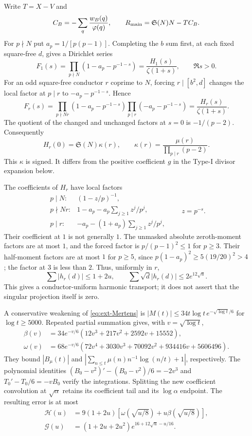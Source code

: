 \documentclass[11pt,a4paper]{article}
\theoremstyle{definition}
\theoremstyle{remark}
\begin{document}
Write $T=X-V$ and
\[
 C_B=-\sum_q\frac{w_B(q)}{\varphi(q)},\qquad
 R_{\rm main}=\mathfrak S(N)N-TC_B.
\]
For $p\nmid N$ put $a_p=1/[p(p-1)]$. Completing the $b$ sum first,
at each fixed square-free $d$, gives a Dirichlet series
\[
 F_1(s)=\prod_{p\nmid N}(1-a_p-p^{-1-s})
           =\frac{H_1(s)}{\zeta(1+s)},\qquad \Re s>0.
\]
For an odd square-free conductor $r$ coprime to $N$, forcing
$r\mid[b^2,d]$ changes the local factor at $p\mid r$ to
$-a_p-p^{-1-s}$. Hence
\[
 F_r(s)=\prod_{p\nmid Nr}(1-a_p-p^{-1-s})
                  \prod_{p\mid r}(-a_p-p^{-1-s})
       =\frac{H_r(s)}{\zeta(1+s)}.
\]
The quotient of the changed and unchanged factors at $s=0$ is
$-1/(p-2)$. Consequently
\begin{equation}\label{eq:ext-Hr}
 H_r(0)=\mathfrak S(N)\kappa(r),\qquad
 \kappa(r)=\frac{\mu(r)}{\prod_{p\mid r}(p-2)}.
\end{equation}
This $\kappa$ is signed. It differs from the positive coefficient
$g$ in the Type-I divisor expansion below.

The coefficients of $H_r$ have local factors
\[
\begin{array}{ll}
 p\mid N:& (1-z/p)^{-1},\\
 p\nmid Nr:&1-a_p-a_p\sum_{j\geq1}z^j/p^j,\\
 p\mid r:&-a_p-(1+a_p)\sum_{j\geq1}z^j/p^j,
\end{array}\qquad z=p^{-s}.
\]
Their coefficient at $1$ is not generally $1$. The unmasked absolute
zeroth-moment factors are at most $1$, and the forced factor is
$p/(p-1)^2\leq1$ for $p\geq3$. Their half-moment factors are at most
$1$ for $p\geq5$, since $p(1-a_p)^2\geq5(19/20)^2>4$; the factor
at $3$ is less than $2$. Thus, uniformly in $r$,
\[
 \sum|h_r(d)|\leq1+2u,\qquad
 \sum\sqrt d|h_r(d)|\leq2e^{12\sqrt u}.
\]
This gives a conductor-uniform harmonic transport; it does not assert
that the singular projection itself is zero.

A conservative weakening of \eqref{eq:ext-Mertens} is
$|M(t)|\leq34t\log t\,e^{-\sqrt{\log t}/6}$ for $\log t\geq5000$.
Repeated partial summation gives, with $v=\sqrt{\log t}$,
\begin{align*}
 \beta(v)&=34e^{-v/6}(12v^3+217v^2+2592v+15552),\\
 \omega(v)&=68e^{-v/6}(72v^4+3030v^3+70092v^2
                                      +934416v+5606496).
\end{align*}
They bound $|B_\mu(t)|$ and
$|\sum_{n\leq t}\mu(n)n^{-1}\log(n/t)+1|$, respectively.
The polynomial identities
$(B_0-v^2)'-(B_0-v^2)/6=-2v^3$ and
$T_0'-T_0/6=-vB_0$ verify the integrations. Splitting the new
coefficient convolution at $\sqrt\alpha$ retains its coefficient tail
and its $\log\alpha$ endpoint. The resulting error is at most
\begin{align*}
 \mathcal H(u)&=9(1+2u)
            [\omega(\sqrt{u/8})+u\beta(\sqrt{u/8})],\\
 \mathcal G(u)&=(1+2u+2u^2)
                       e^{16+12\sqrt u-u/16}.
\end{align*}
\end{document}
